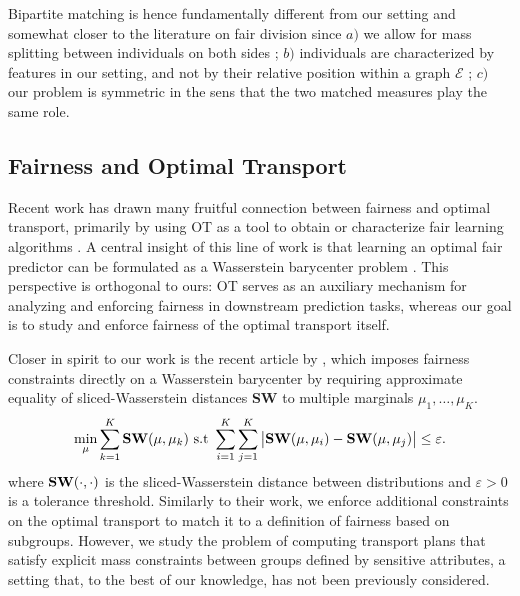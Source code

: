 \documentclass{article}
\theoremstyle{definition}
\begin{document}
Bipartite matching is hence fundamentally different from our setting and somewhat closer to the literature on fair division \citep{steinhaus1949division,weller1985fair, budish2011combinatorial} since $a)$ we allow for mass splitting between individuals on both sides ; $b)$ individuals are characterized by features in our setting, and not by their relative position within a graph $\mathcal{E}$ ; $c)$ our problem is symmetric in the sens that the two matched measures play the same role. 
\subsection{Fairness and Optimal Transport} Recent work has drawn many fruitful connection between fairness and optimal transport, primarily by using OT as a tool to obtain or characterize fair learning algorithms \citep{gordaliza2019obtaining,gouic2020projection,chzhen2020fair,DBLP:conf/aaai/ChiappaJSPJA20,DBLP:conf/nips/BuylB22,hu2023fairness,DBLP:conf/icml/XianY023,chowdhary2024fairness,xiong2024fair,divol2024demographic}. A central insight of this line of work is that learning an optimal fair predictor can be formulated as a Wasserstein barycenter problem \citep{gouic2020projection,chzhen2020fair,divol2024demographic}. This perspective is orthogonal to ours: OT serves as an auxiliary mechanism for analyzing and enforcing fairness in downstream prediction tasks, whereas our goal is to study and enforce fairness of the optimal transport itself.

Closer in spirit to our work is the recent article by \citet{nguyen2024towards}, which imposes fairness constraints directly on a Wasserstein barycenter by requiring approximate equality of sliced-Wasserstein distances \textbf{SW} \citep{nadjahi2020statistical} to multiple marginals $\mu_1,\dots,\mu_K$.
\begin{align*}
\min\limits_{\mu } \sum\limits_{k=1}^K \textnormal{\textbf{SW}}(\mu,\mu_k) \textnormal{ s.t }  \sum\limits_{i=1}^K\sum\limits_{j=1}^K \big\lvert \textnormal{\textbf{SW}}(\mu,\mu_i) - \textnormal{\textbf{SW}}(\mu,\mu_j)\big\lvert \leq \varepsilon.
\end{align*}
 where $\textnormal{\textbf{SW}}(\cdot,\cdot)$ is the sliced-Wasserstein distance between distributions \citep{nadjahi2020statistical} and $\varepsilon>0$ is a tolerance threshold. Similarly to their work, we enforce additional constraints on the optimal transport to match it to a definition of fairness based on subgroups. However, we study the problem of computing transport plans that satisfy explicit mass constraints between groups defined by sensitive attributes, a setting that, to the best of our knowledge, has not been previously considered. 
\end{document}
